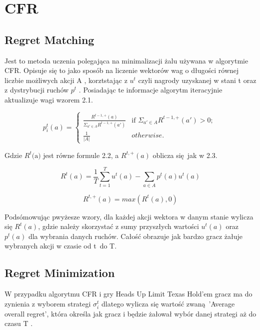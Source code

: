 \documentclass[12pt,oneside,a4paper]{report}
\begin{document}
\chapter{CFR}

\section{Regret Matching}

Jest to metoda uczenia polegająca na minimalizacji żalu używana w algorytmie CFR.
Opisuje się to jako sposób na liczenie wektorów wag o długości równej liczbie możliwych akcji A
, korztstając z $u^{t}$ czyli nagrody uzyskanej w stani t oraz z dystrybucji ruchów $p^{t}$ \cite{rmg}. 
Posiadając te informacje algorytm iteracyjnie aktualizuje wagi wzorem 2.1.


\begin{equation}
p^{t}_{i}\left( a \right) = \left\{ \begin{array}{ll}
      \frac{R^{t-1, \text{+}}\left(a\right)}{ \Sigma_{a' \in A} R^{t-1,\text{+}}\left(a'\right)} &
      \mbox{if $\Sigma_{a' \in A} R^{t-1,\text{+}}\left(a'\right) >
      0$};\\
      \frac{1}{|A|} & \mbox{$otherwise$}.\end{array} \right. \ 
\end{equation}

Gdzie $R^{t} \text{(a)}$ jest równe formule 2.2, a $R^{t,\text{+}}(a)$ oblicza się jak w 2.3.

\begin{equation}
   R^{t} (a) = \frac{1}{T} {\sum_{t=1}^{T} u^{t} (a)} - \sum_{a \in A} p^{t} (a) u^{t} (a)
\end{equation}

\begin{equation}
   R^{t,\text{+}}(a) = max(R^t(a),0)
\end{equation}

Podsómowując pwyżesze wzory, dla każdej akcji wektora w danym stanie wylicza się $R^{t}(a)$, gdzie
należy skorzystać z sumy przyszłych wartości $u^{t}(a)$ oraz $p^{t}(a)$ 
dla wybrania danych ruchów. Całość obrazuje jak bardzo gracz żałuje wybranych
akcji w czasie od t do T.

\section{Regret Minimization}

W przypadku algorytmu CFR i gry Heads Up Limit Texas Hold'em gracz ma do zynienia z wyborem strategi
$\sigma_{i}^{t}$ dlatego wylicza się wartość zwaną 'Average overall regret', która określa jak gracz
i będzie żałował wybór danej strategi aż do czasu T \cite{rmg}.
\end{document}
